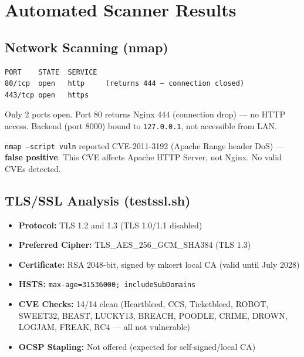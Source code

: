 \documentclass[11pt,a4paper]{article}
\begin{document}
\newpage
\section{Automated Scanner Results}

\subsection{Network Scanning (nmap)}

\begin{tcolorbox}[colback=pass!5, colframe=pass, title=\textbf{Port Scan --- PASS}]
\begin{verbatim}
PORT    STATE  SERVICE
80/tcp  open   http     (returns 444 — connection closed)
443/tcp open   https
\end{verbatim}
Only 2 ports open. Port 80 returns Nginx 444 (connection drop) --- no HTTP access. Backend (port 8000) bound to \texttt{127.0.0.1}, not accessible from LAN.
\end{tcolorbox}

\begin{tcolorbox}[colback=pass!5, colframe=pass, title=\textbf{NSE Vulnerability Scripts --- PASS}]
\texttt{nmap --script vuln} reported CVE-2011-3192 (Apache Range header DoS) --- \textbf{false positive}. This CVE affects Apache HTTP Server, not Nginx. No valid CVEs detected.
\end{tcolorbox}

\subsection{TLS/SSL Analysis (testssl.sh)}

\begin{tcolorbox}[colback=pass!5, colframe=pass, title=\textbf{TLS Configuration --- PASS}]
\begin{itemize}[nosep]
  \item \textbf{Protocol:} TLS 1.2 and 1.3 (TLS 1.0/1.1 disabled)
  \item \textbf{Preferred Cipher:} TLS\_AES\_256\_GCM\_SHA384 (TLS 1.3)
  \item \textbf{Certificate:} RSA 2048-bit, signed by mkcert local CA (valid until July 2028)
  \item \textbf{HSTS:} \texttt{max-age=31536000; includeSubDomains}
  \item \textbf{CVE Checks:} 14/14 clean (Heartbleed, CCS, Ticketbleed, ROBOT, SWEET32, BEAST, LUCKY13, BREACH, POODLE, CRIME, DROWN, LOGJAM, FREAK, RC4 --- all not vulnerable)
  \item \textbf{OCSP Stapling:} Not offered (expected for self-signed/local CA)
\end{itemize}
\end{tcolorbox}
\end{document}
